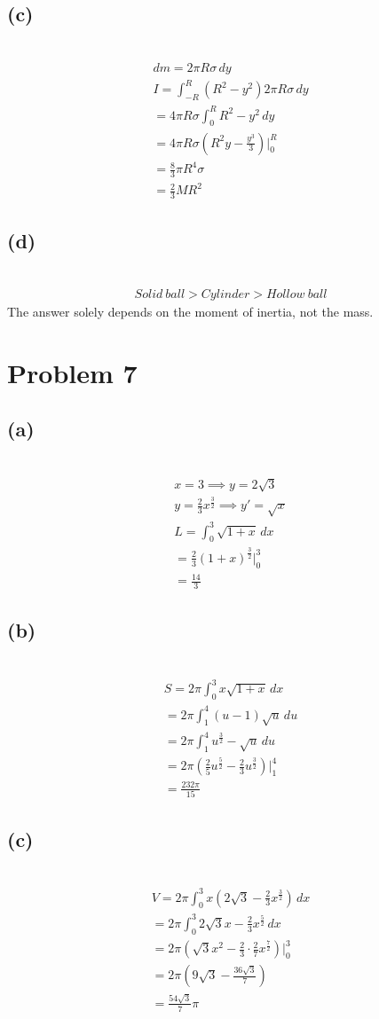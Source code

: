 \documentclass[12pt]{article}
\newcommand{\at}{\Big|}
\newcommand{\problem}[1]{\section{Problem #1}}
\newcommand{\subproblem}[1]{\subsection{(#1)} \,}
\begin{document}
\subproblem{c}
\begin{gather*}
    dm= 2\pi R\sigma \, dy\\
    I= \int_{-R}^R (R^2-y^2)2\pi R\sigma \, dy\\
    =4\pi R\sigma \int_0^R R^2-y^2\, dy\\
    =4\pi R\sigma (R^2 y - \frac{y^3}{3})\at_0^R\\
    =\frac{8}{3}\pi R^4 \sigma \\
    =\boxed{\frac{2}{3}MR^2}
\end{gather*}

\subproblem{d}
\begin{gather*}
    Solid \ ball > Cylinder > Hollow \ ball
\end{gather*}
The answer solely depends on the moment of inertia, not the mass.

\problem{7}

\subproblem{a}
\begin{gather*}
    x=3\implies y = 2\sqrt{3}\\
    y=\frac{2}{3}x^\frac{3}{2} \implies y'=\sqrt{x}\\
    L= \int_0^3 \sqrt{1+x} \, dx\\
    =   \frac{2}{3}(1+x)^\frac{3}{2}\at_0^3\\
    = \boxed{\frac{14}{3}}
\end{gather*}

\subproblem{b}
\begin{gather*}
    S= 2\pi \int_0^3 x \sqrt{1+x} \, dx\\
    = 2\pi \int_1^4(u-1)\sqrt{u} \, du\\
    = 2\pi \int_1^4 u^\frac{3}{2}-\sqrt{u} \, du\\
    = 2\pi (\frac{2}{5}u^\frac{5}{2} - \frac{2}{3}u^\frac{3}{2})\at_1^4\\
    = \boxed{\frac{232\pi}{15}}
\end{gather*}

\subproblem{c}
\begin{gather*}
    V=2\pi \int_0^3  x (2\sqrt{3}-\frac{2}{3}x^\frac{3}{2})\, dx\\
    = 2\pi \int_0^3 2\sqrt{3}x - \frac{2}{3}x^\frac{5}{2} \, dx\\
    = 2\pi (\sqrt{3}x^2 - \frac{2}{3}\cdot \frac{2}{7} x^\frac{7}{2})\at_0^3\\
    =2\pi (9\sqrt{3} - \frac{36\sqrt{3}}{7} )\\
    =\boxed{\frac{54\sqrt{3}}{7}\pi }
\end{gather*}
\end{document}
